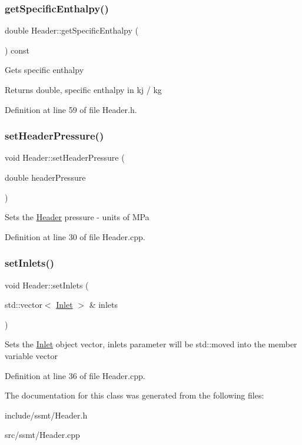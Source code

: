 \subsubsection{\texorpdfstring{get\+Specific\+Enthalpy()}{getSpecificEnthalpy()}}
{\footnotesize\ttfamily double Header\+::get\+Specific\+Enthalpy (\begin{DoxyParamCaption}{ }\end{DoxyParamCaption}) const\hspace{0.3cm}{\ttfamily [inline]}}

Gets specific enthalpy \begin{DoxyReturn}{Returns}
double, specific enthalpy in kj / kg 
\end{DoxyReturn}


Definition at line 59 of file Header.\+h.

\mbox{\label{class_header_a3af0b7964b74287ce0c662b9a88556ed}} 
\subsubsection{\texorpdfstring{set\+Header\+Pressure()}{setHeaderPressure()}}
{\footnotesize\ttfamily void Header\+::set\+Header\+Pressure (\begin{DoxyParamCaption}\item[{double}]{header\+Pressure }\end{DoxyParamCaption})}

Sets the \hyperlink{class_header}{Header} pressure -\/ units of M\+Pa 

Definition at line 30 of file Header.\+cpp.

\mbox{\label{class_header_ae69b6f894210a6cd340e92222f8bc343}} 
\subsubsection{\texorpdfstring{set\+Inlets()}{setInlets()}}
{\footnotesize\ttfamily void Header\+::set\+Inlets (\begin{DoxyParamCaption}\item[{std\+::vector$<$ \hyperlink{class_inlet}{Inlet} $>$ \&}]{inlets }\end{DoxyParamCaption})}

Sets the \hyperlink{class_inlet}{Inlet} object vector, inlets parameter will be std\+::moved into the member variable vector 

Definition at line 36 of file Header.\+cpp.



The documentation for this class was generated from the following files\+:\begin{DoxyCompactItemize}
\item 
include/ssmt/Header.\+h\item 
src/ssmt/Header.\+cpp\end{DoxyCompactItemize}
